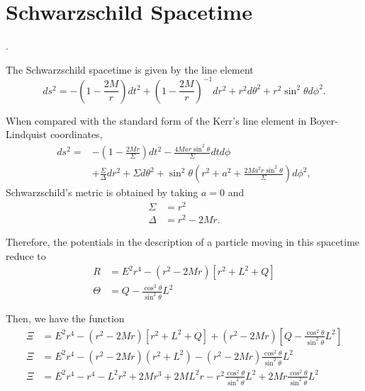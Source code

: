 
\section{Schwarzschild Spacetime}.

The Schwarzschild spacetime is given by the line element
\begin{equation}
	ds^2 = -\left( 1 - \frac{2M}{r}\right) dt^2 + \left( 1 - \frac{2M}{r}\right)^{-1} dr^2 + r^2 d\theta^2 + r^2 \sin^2 \theta d\phi^2.
\end{equation}

When compared with the standard form of the Kerr's line element in Boyer-Lindquist coordinates,
\begin{align}
	ds^2 = &-\left( 1- \frac{2Mr}{\Sigma} \right) dt^2 -\frac{4Mar\sin^2 \theta}{\Sigma} dt d\phi \nonumber  \\
	&+ \frac{\Sigma}{\Delta} dr^2 +\Sigma d\theta^2 + \sin^2 \theta \left( r^2 + a^2 +\frac{2Ma^2 r \sin^2 \theta}{\Sigma} \right) d\phi^2,
\end{align}
Schwarzschild's metric is obtained by taking $a=0$ and
\begin{align}
	\Sigma &= r^2 \\
	\Delta &= r^2 -2Mr.
\end{align}

Therefore, the potentials in the description of a particle moving in this spacetime reduce to
\begin{align}
	R &= E^2 r^4 - (r^2 -2Mr) \left[ r^2 + L^2 + Q \right] \\
	\Theta &= Q -  \frac{\cos^2 \theta}{\sin^2 \theta}L^2
\end{align}

Then, we have the function
\begin{align}
	\Xi &= E^2 r^4 - (r^2 -2Mr) \left[ r^2 + L^2 + Q \right] + (r^2 -2Mr) \left[ Q -  \frac{\cos^2 \theta}{\sin^2 \theta}L^2 \right] \nonumber \\
	\Xi &= E^2 r^4 - (r^2 -2Mr) ( r^2 + L^2 ) - (r^2 -2Mr) \frac{\cos^2 \theta}{\sin^2 \theta}L^2 \nonumber \\
	\Xi &= E^2 r^4 - r^4 - L^2 r^2 + 2Mr^3 + 2ML^2r - r^2 \frac{\cos^2 \theta}{\sin^2 \theta}L^2 
	  + 2Mr \frac{\cos^2 \theta}{\sin^2 \theta}L^2 
\end{align}

